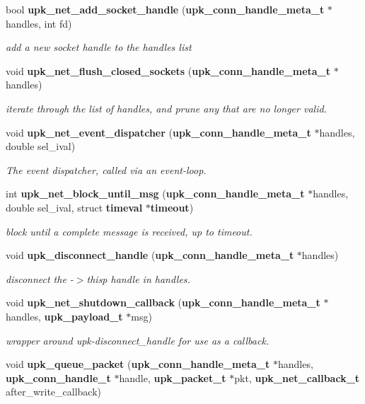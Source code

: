 \begin{DoxyCompactItemize}
bool {\bf upk\_\-net\_\-add\_\-socket\_\-handle} ({\bf upk\_\-conn\_\-handle\_\-meta\_\-t} $\ast$handles, int fd)
\begin{DoxyCompactList}\small\item\em add a new socket handle to the handles list \end{DoxyCompactList}\item 
void {\bf upk\_\-net\_\-flush\_\-closed\_\-sockets} ({\bf upk\_\-conn\_\-handle\_\-meta\_\-t} $\ast$handles)
\begin{DoxyCompactList}\small\item\em iterate through the list of handles, and prune any that are no longer valid. \end{DoxyCompactList}\item 
void {\bf upk\_\-net\_\-event\_\-dispatcher} ({\bf upk\_\-conn\_\-handle\_\-meta\_\-t} $\ast$handles, double sel\_\-ival)
\begin{DoxyCompactList}\small\item\em The event dispatcher, called via an event-\/loop. \end{DoxyCompactList}\item 
int {\bf upk\_\-net\_\-block\_\-until\_\-msg} ({\bf upk\_\-conn\_\-handle\_\-meta\_\-t} $\ast$handles, double sel\_\-ival, struct {\bf timeval} $\ast${\bf timeout})
\begin{DoxyCompactList}\small\item\em block until a complete message is received, up to timeout. \end{DoxyCompactList}\item 
void {\bf upk\_\-disconnect\_\-handle} ({\bf upk\_\-conn\_\-handle\_\-meta\_\-t} $\ast$handles)
\begin{DoxyCompactList}\small\item\em disconnect the -\/$>$thisp handle in handles. \end{DoxyCompactList}\item 
void {\bf upk\_\-net\_\-shutdown\_\-callback} ({\bf upk\_\-conn\_\-handle\_\-meta\_\-t} $\ast$handles, {\bf upk\_\-payload\_\-t} $\ast$msg)
\begin{DoxyCompactList}\small\item\em wrapper around upk-\/disconnect\_\-handle for use as a callback. \end{DoxyCompactList}\item 
void {\bf upk\_\-queue\_\-packet} ({\bf upk\_\-conn\_\-handle\_\-meta\_\-t} $\ast$handles, {\bf upk\_\-conn\_\-handle\_\-t} $\ast$handle, {\bf upk\_\-packet\_\-t} $\ast$pkt, {\bf upk\_\-net\_\-callback\_\-t} after\_\-write\_\-callback)

\end{DoxyCompactItemize}
